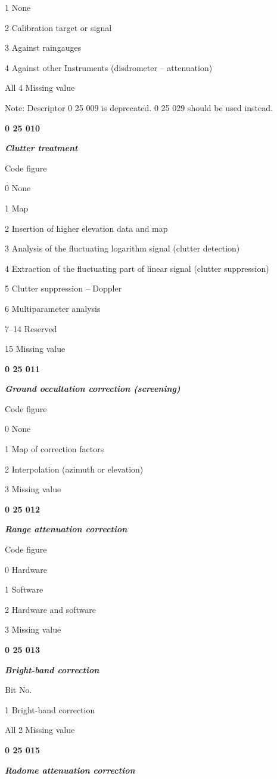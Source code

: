 1 None

2 Calibration target or signal

3 Against raingauges

4 Against other Instruments (disdrometer -- attenuation)

All 4 Missing value

Note: Descriptor 0 25 009 is deprecated. 0 25 029 should be used instead.

\textbf{0 25 010}

\emph{\textbf{Clutter treatment}}

Code figure

0 None

1 Map

2 Insertion of higher elevation data and map

3 Analysis of the fluctuating logarithm signal (clutter detection)

4 Extraction of the fluctuating part of linear signal (clutter suppression)

5 Clutter suppression -- Doppler

6 Multiparameter analysis

7--14 Reserved

15 Missing value

\textbf{0 25 011}

\emph{\textbf{Ground occultation correction (screening)}}

Code figure

0 None

1 Map of correction factors

2 Interpolation (azimuth or elevation)

3 Missing value

\textbf{0 25 012}

\emph{\textbf{Range attenuation correction}}

Code figure

0 Hardware

1 Software

2 Hardware and software

3 Missing value

\textbf{0 25 013}

\emph{\textbf{Bright-band correction}}

Bit No.

1 Bright-band correction

All 2 Missing value

\textbf{0 25 015}

\emph{\textbf{Radome attenuation correction}}

